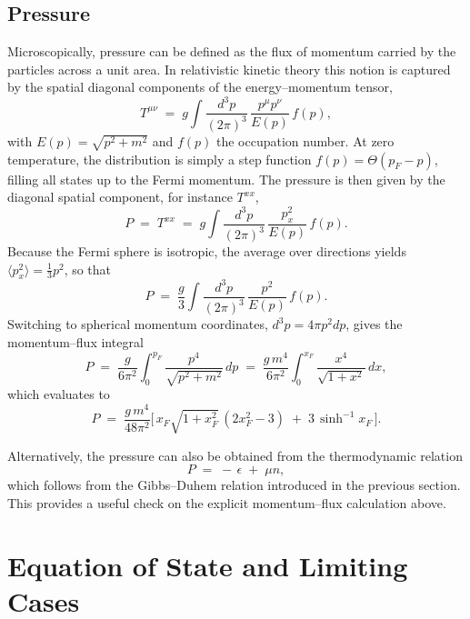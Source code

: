 \subsection*{Pressure}
Microscopically, pressure can be defined as the flux of momentum carried by the particles across a unit area. 
In relativistic kinetic theory this notion is captured by the spatial diagonal components of the energy--momentum tensor,
\begin{equation}
T^{\mu\nu} \;=\; g \int \frac{d^3p}{(2\pi)^3}\,\frac{p^\mu p^\nu}{E(p)}\,f(p),
\end{equation}
with $E(p)=\sqrt{p^2+m^2}$ and $f(p)$ the occupation number. 
At zero temperature, the distribution is simply a step function $f(p)=\Theta(p_F-p)$, filling all states up to the Fermi momentum. 
The pressure is then given by the diagonal spatial component, for instance $T^{xx}$,
\begin{equation}
P \;=\; T^{xx} \;=\; g \int \frac{d^3p}{(2\pi)^3}\,\frac{p_x^2}{E(p)}\,f(p).
\end{equation}
Because the Fermi sphere is isotropic, the average over directions yields $\langle p_x^2 \rangle = \frac{1}{3}p^2$, so that
\begin{equation}
P \;=\; \frac{g}{3}\int \frac{d^3p}{(2\pi)^3}\,\frac{p^2}{E(p)}\,f(p).
\end{equation}
Switching to spherical momentum coordinates, $d^3p=4\pi p^2 dp$, gives the momentum--flux integral
\begin{equation}
P \;=\; \frac{g}{6\pi^2}\int_0^{p_F}\frac{p^4}{\sqrt{p^2+m^2}}\,dp
\;=\; \frac{g\,m^4}{6\pi^2}\int_0^{x_F}\frac{x^4}{\sqrt{1+x^2}}\,dx,
\label{eq:pressure_integral}
\end{equation}
which evaluates to
\begin{equation}
P \;=\; \frac{g\,m^4}{48\pi^2}
\Big[\,x_F\sqrt{1+x_F^2}\,(2x_F^2-3)\;+\;3\,\sinh^{-1}x_F\,\Big].
\label{eq:pressure}
\end{equation}

\noindent
Alternatively, the pressure can also be obtained from the thermodynamic relation
\begin{equation}
P \;=\; -\,\epsilon \;+\; \mu n,
\end{equation}
which follows from the Gibbs--Duhem relation introduced in the previous section. 
This provides a useful check on the explicit momentum--flux calculation above.

\section{Equation of State and Limiting Cases}

